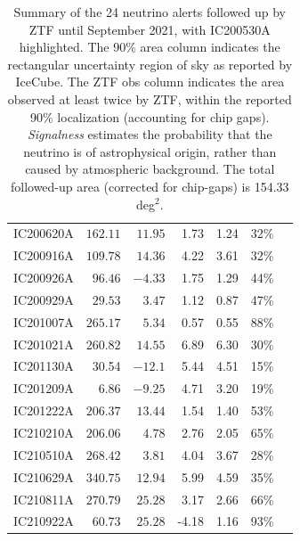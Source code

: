 \documentclass[
    a4paper, %
    fontsize=10pt, %
    twoside=true, %
    numbers=noenddot, %
    fontmethod=tex,
]{kaobook}
\begin{document}
\begin{table}
\begin{tabular}{l r r r r r c}
        IC200620A & $162.11$ & $11.95$ & 1.73 & 1.24 & 32\%&\cite{IC200620A1, IC200620A2}\\
        IC200916A & $109.78$ & $14.36$ & 4.22 & 3.61 & 32\%&\cite{IC200916A1, IC200916A2, IC200916A3}\\
        IC200926A & $96.46$ & $-4.33$ & 1.75 & 1.29 & 44\%&\cite{IC200926A1, IC200926A2}\\
        IC200929A & $29.53$ & $3.47$ & 1.12 & 0.87 & 47\%&\cite{IC200929A1, IC200929A2}\\
        IC201007A & $265.17$ & $5.34$ & 0.57 & 0.55 & 88\%&\cite{IC201007A1, IC201007A2}\\
        IC201021A & $260.82$ & $14.55$ & 6.89 & 6.30 & 30\%&\cite{IC201021A1, IC201021A2}\\
        IC201130A & 30.54 & $-12.1$ & 5.44 & 4.51 & 15\%&\cite{IC201130A1, IC201130A2}\\
        IC201209A & $6.86$ & $-9.25$ & 4.71 & 3.20 & 19\%&\cite{IC201209A1, IC201209A2}\\
        IC201222A & $206.37$ & $13.44$ & 1.54 & 1.40 & 53\%&\cite{IC201222A1, IC201222A2}\\
        IC210210A & $206.06$ & $4.78$ & 2.76 & 2.05 & 65\%&\cite{IC210210A1, IC210210A2}\\
        IC210510A & $268.42$ & $3.81$ & 4.04 & 3.67 & 28\%&\cite{IC210510A1, IC210510A2}\\
        IC210629A & $340.75$ & $12.94$ & 5.99 & 4.59 & 35\%&\cite{IC210629A1, IC210629A2}\\
        IC210811A & $270.79$ & $25.28$ & 3.17 & 2.66 & 66\%&\cite{IC210811A1, IC210811A2}\\
        IC210922A & $60.73$ & $25.28$ & -4.18 & 1.16 & 93\%&\cite{IC210922A1, IC210922A2}\\
    \end{tabular}
    \caption{Summary of the 24 neutrino alerts followed up by ZTF until September 2021, with IC200530A highlighted. The 90\% area column indicates the rectangular uncertainty region of sky as reported by IceCube. The ZTF obs column indicates the area observed at least twice by ZTF, within the reported 90\% localization (accounting for chip gaps). \textit{Signalness} estimates the probability that the neutrino is of astrophysical origin, rather than caused by atmospheric background. The total followed-up area (corrected for chip-gaps) is 154.33 deg$^{2}$. }
    \label{tab:neutrino_alert_overview}
\end{table}
\end{document}
